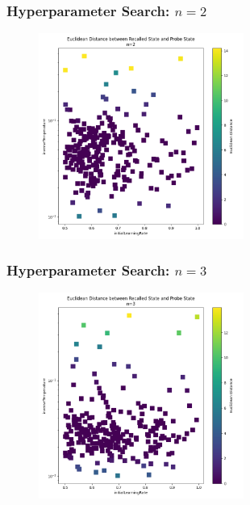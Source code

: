 
\begin{frame}
    \frametitle{Hyperparameter Search: \(n=2\)}

    \begin{figure}
        \includegraphics[width=0.6\textwidth]{images/hyperparameterSearches/2.png}
    \end{figure}
\end{frame}

\begin{frame}
    \frametitle{Hyperparameter Search: \(n=3\)}

    \begin{figure}
        \includegraphics[width=0.6\textwidth]{images/hyperparameterSearches/3.png}
    \end{figure}
\end{frame}

